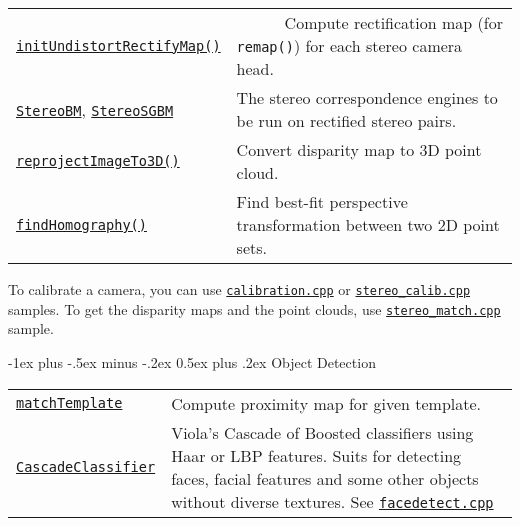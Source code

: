 \documentclass[10pt,landscape]{article}
\makeatletter
\renewcommand{\section}{\@startsection{section}{1}{0mm}%
                                {-1ex plus -.5ex minus -.2ex}%
                                {0.5ex plus .2ex}%
                                {\normalfont\large\bfseries}}
\makeatother
\begin{document}
\begin{multicols}{3}
\begin{tabular}{@{}p{\the\MyLen}%
                @{}p{\linewidth-\the\MyLen}@{}}
\texttt{\href{http://opencv.willowgarage.com/documentation/cpp/calib3d_camera_calibration_and_3d_reconstruction.html\#cv-initundistortrectifymap}{initUndistortRectifyMap()}} & \ \ \ \ \ \ Compute rectification map (for \texttt{remap()}) for each stereo camera head.\\

\texttt{\href{http://opencv.willowgarage.com/documentation/cpp/calib3d_camera_calibration_and_3d_reconstruction.html\#cv-StereoBM}{StereoBM}}, \texttt{\href{http://opencv.willowgarage.com/documentation/cpp/calib3d_camera_calibration_and_3d_reconstruction.html\#cv-StereoSGBM}{StereoSGBM}} & The stereo correspondence engines to be run on rectified stereo pairs.\\

\texttt{\href{http://opencv.willowgarage.com/documentation/cpp/calib3d_camera_calibration_and_3d_reconstruction.html\#cv-reprojectimageto3d}{reprojectImageTo3D()}} & Convert disparity map to 3D point cloud.\\

\texttt{\href{http://opencv.willowgarage.com/documentation/cpp/calib3d_camera_calibration_and_3d_reconstruction.html\#cv-findhomography}{findHomography()}} & Find best-fit perspective transformation between two 2D point sets. \\

\end{tabular}

To calibrate a camera, you can use \texttt{\href{https://code.ros.org/svn/opencv/trunk/opencv/samples/cpp/calibration.cpp}{calibration.cpp}} or
\texttt{\href{https://code.ros.org/svn/opencv/trunk/opencv/samples/cpp/stereo\_calib.cpp}{stereo\_calib.cpp}} samples.
To get the disparity maps and the point clouds, use
\texttt{\href{https://code.ros.org/svn/opencv/trunk/opencv/samples/cpp/stereo\_match.cpp}{stereo\_match.cpp}} sample.

\section{Object Detection}

\begin{tabular}{@{}p{\the\MyLen}%
                @{}p{\linewidth-\the\MyLen}@{}}
                \texttt{\href{http://opencv.willowgarage.com/documentation/cpp/objdetect__object_detection.html\#matchTemplate}{matchTemplate}} & Compute proximity map for given template.\\

\texttt{\href{http://opencv.willowgarage.com/documentation/cpp/objdetect__object_detection.html\#CascadeClassifier}{CascadeClassifier}} & Viola's Cascade of Boosted classifiers using Haar or LBP features. Suits for detecting faces, facial features and some other objects without diverse textures. See \texttt{\href{https://code.ros.org/svn/opencv/trunk/opencv/samples/cpp/facedetect.cpp}{facedetect.cpp}}\\


\end{tabular}
\end{multicols}
\end{document}
